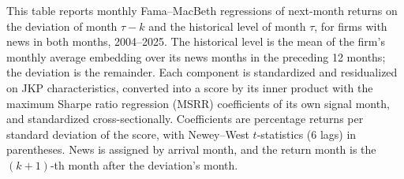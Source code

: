 \begin{table}[htbp]
\centering
\caption{Return Regressions on Lagged Deviations and Current Levels}
\label{tab:tab9}
\begin{minipage}{\linewidth}\footnotesize
This table reports monthly Fama--MacBeth regressions of next-month returns on the deviation of month $\tau-k$ and the historical level of month $\tau$, for firms with news in both months, 2004--2025. The historical level is the mean of the firm's monthly average embedding over its news months in the preceding 12 months; the deviation is the remainder. Each component is standardized and residualized on JKP characteristics, converted into a score by its inner product with the maximum Sharpe ratio regression (MSRR) coefficients of its own signal month, and standardized cross-sectionally. Coefficients are percentage returns per standard deviation of the score, with Newey--West $t$-statistics (6 lags) in parentheses. News is assigned by arrival month, and the return month is the $(k+1)$-th month after the deviation's month.
\end{minipage}
\medskip


\end{table}

